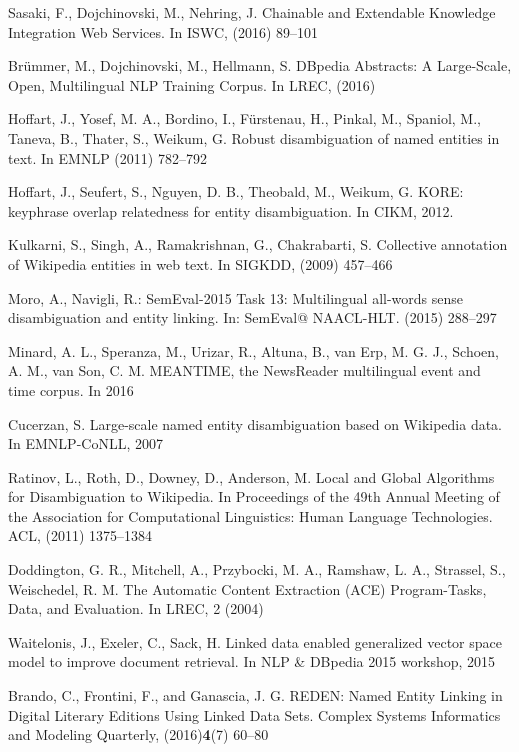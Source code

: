 \documentclass{llncs}
\begin{document}
\begin{thebibliography}{99}
Sasaki, F., Dojchinovski, M., Nehring, J. Chainable and Extendable Knowledge Integration Web Services. In ISWC, (2016) 89--101


Br\"ummer, M., Dojchinovski, M., Hellmann, S. DBpedia Abstracts: A Large-Scale, Open, Multilingual NLP Training Corpus. In LREC, (2016)

Hoffart, J., Yosef, M. A., Bordino, I., F\"urstenau, H., Pinkal, M., Spaniol, M., Taneva, B., Thater, S., Weikum, G. Robust disambiguation of named entities in text. In EMNLP (2011) 782--792

Hoffart, J., Seufert, S., Nguyen, D. B., Theobald, M., Weikum, G. {KORE}: keyphrase overlap relatedness for entity disambiguation. In CIKM, 2012.

Kulkarni, S., Singh, A., Ramakrishnan, G., Chakrabarti, S. Collective annotation of Wikipedia entities in web text. In SIGKDD, (2009) 457--466

Moro, A., Navigli, R.: {SemEval}-2015 {Task} 13: Multilingual all-words sense disambiguation and entity linking. In: SemEval@ NAACL-HLT. (2015) 288--297

Minard, A. L., Speranza, M., Urizar, R., Altuna, B., van Erp, M. G. J., Schoen, A. M., van Son, C. M. MEANTIME, the NewsReader multilingual event and time corpus. In  2016

Cucerzan, S. Large-scale named entity disambiguation based on Wikipedia data. In EMNLP-CoNLL, 2007


Ratinov, L., Roth, D., Downey, D., Anderson, M. Local and Global Algorithms for Disambiguation to Wikipedia. In Proceedings of the 49th Annual Meeting of the Association for Computational Linguistics: Human Language Technologies. ACL, (2011) 1375--1384

Doddington, G. R., Mitchell, A., Przybocki, M. A., Ramshaw, L. A., Strassel, S., Weischedel, R. M. The Automatic Content Extraction (ACE) Program-Tasks, Data, and Evaluation. In LREC, 2 (2004)

Waitelonis, J., Exeler, C., Sack, H. Linked data enabled generalized vector space model to improve document retrieval. In NLP \& DBpedia 2015 workshop, 2015

  Brando, C., Frontini, F., and Ganascia, J. G. REDEN: Named Entity Linking in Digital Literary Editions Using Linked Data Sets. Complex Systems Informatics and Modeling Quarterly, (2016)\textbf{4}(7) 60--80



\end{thebibliography}
\end{document}
